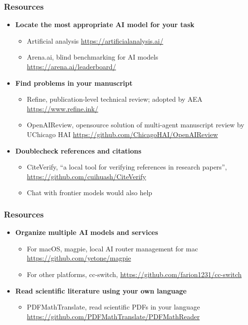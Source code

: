 \documentclass[aspectratio=169]{beamer}
\begin{document}

\begin{frame}
  \frametitle{Resources}
  \begin{itemize}
      \item \textbf{Locate the most appropriate AI model for your task}
        \begin{itemize}
          \item Artificial analysis \url{https://artificialanalysis.ai/}
          \item Arena.ai, blind benchmarking for AI models \url{https://arena.ai/leaderboard/}
        \end{itemize}
      \item \textbf{Find problems in your manuscript}
        \begin{itemize}
          \item Refine, publication-level technical review; adopted by AEA \url{https://www.refine.ink/}
          \item OpenAIReview, opensource solution of multi-agent manuscript review by UChicago HAI \url{https://github.com/ChicagoHAI/OpenAIReview}
          \end{itemize}
      \item \textbf{Doublecheck references and citations}
        \begin{itemize}
          \item CiteVerify, ``a local tool for verifying references in research papers'', \url{https://github.com/cuihuash/CiteVerify}
          \item Chat with frontier models would also help 
          \end{itemize}
  \end{itemize}
\end{frame}

\begin{frame}
  \frametitle{Resources}
  \begin{itemize}
      \item \textbf{Organize multiple AI models and services}
        \begin{itemize}
          \item For macOS, magpie, local AI router management for mac \url{https://github.com/yetone/magpie} 
          \item For other platforms, cc-switch, \url{https://github.com/farion1231/cc-switch}
        \end{itemize}
      \item \textbf{Read scientific literature using your own language}
        \begin{itemize}
          \item PDFMathTranslate, read scientific PDFs in your language \url{https://github.com/PDFMathTranslate/PDFMathReader} \parencite{ouyang-etal-2025-pdfmathtranslate}
        \end{itemize}
  \end{itemize}
\end{frame}
\end{document}
